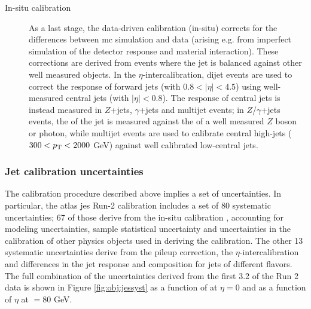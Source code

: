 \begin{description}
\item[In-situ calibration] As a last stage, the data-driven calibration (in-situ) \cite{ATLAS-CONF-2015-017} corrects for the differences between \gls{mc} simulation and data (arising e.g. from imperfect simulation of the detector response and material interaction). These corrections are derived from events where the jet \pt is balanced against other well measured objects. In the $\eta$-intercalibration, dijet events are used to correct the response of forward jets (with $0.8 < |\eta| < 4.5$) using well-measured central jets (with $|\eta| < 0.8$). 
The response of central jets is instead measured in $Z$+jets, $\gamma$+jets and multijet events; 
in $Z$/$\gamma$+jets events, the \pt of the jet is measured against the \pt of a well measured $Z$ boson or photon, while 
multijet events are used to calibrate central high-\pt jets ($300 < p_{\rm T} < 2000$ GeV) against 
well calibrated low-\pt central jets. 
 
\end{description}

\subsubsection*{Jet calibration uncertainties}

The calibration procedure described above implies a set of uncertainties. In particular, 
the \gls{atlas} \gls{jes} Run-2 calibration includes a set of 80 systematic uncertainties; 
67 of those derive from the in-situ calibration \cite{PhysRevD.96.072002}, accounting for modeling uncertainties, 
sample statistical uncertainty and uncertainties in the calibration of other physics objects used in deriving the calibration. 
The other 13 systematic uncertainties derive from the pileup correction, the $\eta$-intercalibration 
and differences in the jet response and composition for jets of different flavors. 
The full combination of the uncertainties derived from the first 3.2 \ifb of the Run 2 data 
is shown in Figure \ref{fig:obj:jessyst} as a function of \pt at $\eta = 0$ and as a function of $\eta$ at \pt$ = 80$ GeV.

